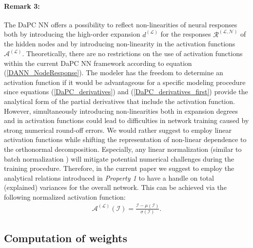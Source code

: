 \documentclass[a4paper,fleqn]{article}
\newcommand{\rw}[1]{\textcolor{blue}{#1}}
\renewcommand{\rw}[1]{#1}
\begin{document}
\paragraph{Remark 3:} 
The DaPC NN offers a possibility to reflect non-linearities of neural responses both by introducing the high-order expansion $d^{(\mathcal{L})}$ for the responses $\mathcal{R}^{(\mathcal{L},\mathcal{N})}$ of the hidden nodes and by introducing non-linearity in the activation functions $\mathcal{A}^{(\mathcal{L})}$. \rw{Theoretically, there are no restrictions on the use of activation functions within the current DaPC NN framework according to equation (\ref{DANN_NodeResponse}). The modeler has the freedom to determine an activation function if it would be advantageous for a specific modeling procedure since equations (\ref{DaPC_derivatives}) and (\ref{DaPC_derivatives_first}) provide the analytical form of the partial derivatives that include the activation function.} However, simultaneously introducing non-linearities both in expansion degrees and in activation functions could lead to difficulties in network training caused by strong numerical round-off errors. We would rather suggest to employ linear activation functions while shifting the representation of non-linear dependence to the orthonormal decomposition. Especially, any linear normalization (similar to batch normalization \cite{ioffe2015batch}) will mitigate potential numerical challenges during the training procedure. Therefore, in the current paper we suggest to employ the analytical relations introduced in \textit{Property 1} to have a handle on total (explained) variances for the overall network. This can be achieved via the following normalized activation function: 
%
\begin{eqnarray}
\label{DaPC_normalization}
\mathcal{A}^{(\mathcal{L})} (\mathcal{I})=\frac{\mathcal{I}-\mu\left(\mathcal{I}\right)}{\sigma\left(\mathcal{I}\right)}.
\end{eqnarray}
%

\subsection{Computation of weights}
\label{Section_DaPC_training}
\end{document}
